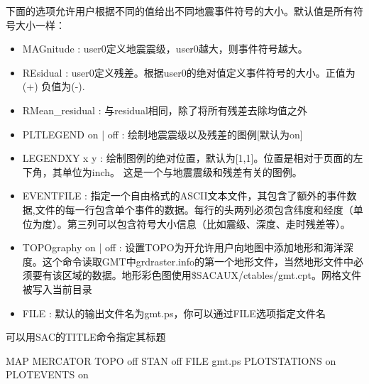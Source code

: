 下面的选项允许用户根据不同的值给出不同地震事件符号的大小。默认值是所有符号大小一样：
\begin{itemize}
\item MAGnitude : user0定义地震震级，user0越大，则事件符号越大。
\item REsidual : user0定义残差。根据user0的绝对值定义事件符号的大小。正值为(+) 负值为(-).
\item RMean\_residual : 与residual相同，除了将所有残差去除均值之外
\item PLTLEGEND on | off : 绘制地震震级以及残差的图例[默认为on] 
\item LEGENDXY x y : 绘制图例的绝对位置，默认为[1,1]。位置是相对于页面的左下角，其单位为inch。 这是一个与地震震级和残差有关的图例。
\item EVENTFILE : 指定一个自由格式的ASCII文本文件，其包含了额外的事件数据,文件的每一行包含单个事件的数据。每行的头两列必须包含纬度和经度（单位为度）。第三列可以包含符号大小信息（比如震级、深度、走时残差等）。
\item TOPOgraphy on | off : 设置TOPO为开允许用户向地图中添加地形和海洋深度。这个命令读取GMT中grdraster.info的第一个地形文件，当然地形文件中必须要有该区域的数据。地形彩色图使用\$SACAUX/ctables/gmt.cpt。网格文件被写入当前目录
\item FILE : 默认的输出文件名为gmt.ps，你可以通过FILE选项指定文件名
\end{itemize}
可以用SAC的TITLE命令指定其标题

   MAP MERCATOR TOPO off STAN off FILE gmt.ps PLOTSTATIONS on PLOTEVENTS on

